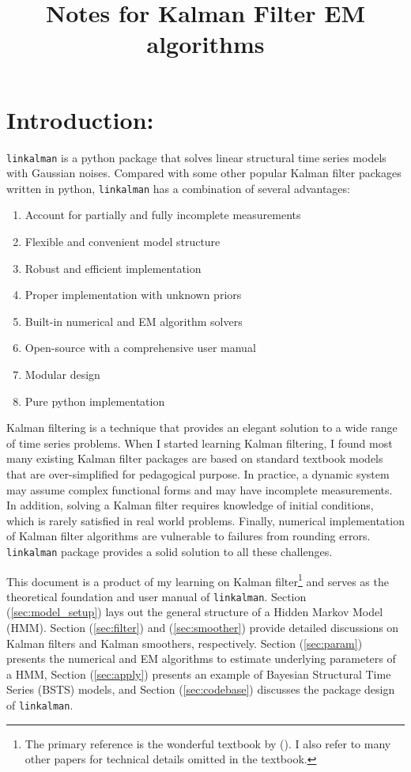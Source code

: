 \documentclass[10pt]{article}
\newenvironment{boenumerate}
    {\begin{enumerate}\renewcommand\labelenumi{\textbf\theenumi}}
    {\end{enumerate}}
\numberwithin{equation}{section}
\begin{document}
\title{Notes for Kalman Filter EM algorithms}

\section{Introduction:}
\texttt{linkalman} is a python package that solves linear structural time series models with Gaussian noises. Compared with some other popular Kalman filter packages written in python, \texttt{linkalman} has a combination of several advantages:
\begin{boenumerate}
    \item Account for partially and fully incomplete measurements 
    \item Flexible and convenient model structure
    \item Robust and efficient implementation
    \item Proper implementation with unknown priors
    \item Built-in numerical and EM algorithm solvers
    \item Open-source with a comprehensive user manual 
    \item Modular design
    \item Pure python implementation 
\end{boenumerate}
Kalman filtering is a technique that provides an elegant solution to a wide range of time series problems. When I started learning Kalman filtering, I found most many existing Kalman filter packages are based on standard textbook models that are over-simplified for pedagogical purpose. In practice, a dynamic system may assume complex functional forms and may have incomplete measurements. In addition, solving a Kalman filter requires knowledge of initial conditions, which is rarely satisfied in real world problems. Finally, numerical implementation of Kalman filter algorithms are vulnerable to failures from rounding errors. \texttt{linkalman} package provides a solid solution to all these challenges. 

This document is a product of my learning on Kalman filter\footnote{The primary reference is the wonderful textbook by (\cite{durbin_koopman_2001}). I also refer to many other papers for technical details omitted in the textbook.} and serves as the theoretical foundation and user manual of \texttt{linkalman}. Section (\ref{sec:model_setup}) lays out the general structure of a Hidden Markov Model (HMM). Section (\ref{sec:filter}) and (\ref{sec:smoother}) provide detailed discussions on Kalman filters and Kalman smoothers, respectively. Section (\ref{sec:param}) presents the numerical and EM algorithms to estimate underlying parameters of a HMM, Section (\ref{sec:apply}) presents an example of Bayesian Structural Time Series (BSTS) models, and Section (\ref{sec:codebase}) discusses the package design of \texttt{linkalman}.
\end{document}

